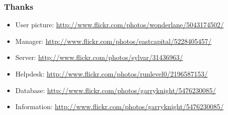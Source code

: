 \documentclass{beamer}
\begin{document}
\begin{frame}
    \frametitle{Thanks}

        \begin{itemize}
                \item User picture: \url{http://www.flickr.com/photos/wonderlane/5043174502/}
                \item Manager: \url{http://www.flickr.com/photos/eastcapital/5228405457/}
                \item Server: \url{http://www.flickr.com/photos/sylvar/31436963/}
                \item Helpdesk: \url{http://www.flickr.com/photos/runlevel0/2196587153/}
                \item Database: \url{http://www.flickr.com/photos/garryknight/5476230085/}
                \item Information: \url{http://www.flickr.com/photos/garryknight/5476230085/}
        \end{itemize}

\end{frame}
\end{document}
